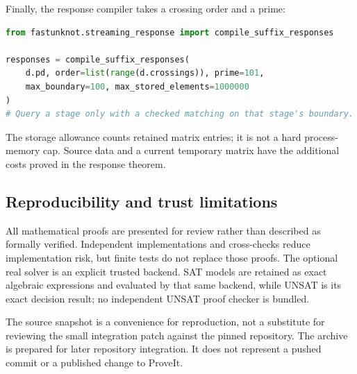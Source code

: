 Finally, the response compiler takes a crossing order and a prime:
\par\noindent\begin{minipage}{\linewidth}
\begin{lstlisting}[language=Python]
from fastunknot.streaming_response import compile_suffix_responses

responses = compile_suffix_responses(
    d.pd, order=list(range(d.crossings)), prime=101,
    max_boundary=100, max_stored_elements=1000000
)
# Query a stage only with a checked matching on that stage's boundary.
\end{lstlisting}
\end{minipage}\par
The storage allowance counts retained matrix entries; it is not a hard
process-memory cap. Source data and a current temporary matrix have the
additional costs proved in the response theorem.

\subsection{Reproducibility and trust limitations}

All mathematical proofs are presented for review rather than described
as formally verified. Independent implementations and cross-checks reduce
implementation risk, but finite tests do not replace those proofs. The
optional real solver is an explicit trusted backend. SAT models are
retained as exact algebraic expressions and evaluated by that same
backend, while UNSAT is its exact decision result; no independent
UNSAT proof checker is bundled.

The source snapshot is a convenience for reproduction, not a substitute
for reviewing the small integration patch against the pinned repository.
The archive is prepared for later repository integration. It does not
represent a pushed commit or a published change to ProveIt.
